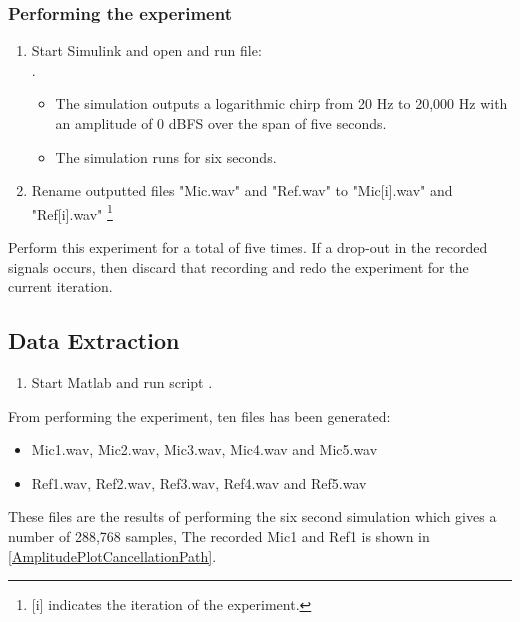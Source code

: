 \subsubsection{Performing the experiment}
\begin{enumerate}
	\item Start Simulink and open and run file:\\ .
	\begin{itemize} 
		\item The simulation outputs a logarithmic chirp from 20 Hz to 20,000 Hz with an amplitude of 0 dBFS over the span of five seconds.
		\item The simulation runs for six seconds.
	\end{itemize}
	\item Rename outputted files "Mic.wav" and "Ref.wav" to "Mic[i].wav" and "Ref[i].wav" \footnote{[i] indicates the iteration of the experiment.}
\end{enumerate}
Perform this experiment for a total of five times. If  a drop-out in the recorded signals occurs, then discard that recording and redo the experiment for the current iteration. 


\subsection{Data Extraction}
\begin{enumerate}
	\item Start Matlab and run script .
\end{enumerate}
From performing the experiment, ten files has been generated:
\begin{itemize}
	\item Mic1.wav, Mic2.wav, Mic3.wav, Mic4.wav and Mic5.wav
	\item Ref1.wav, Ref2.wav, Ref3.wav, Ref4.wav and Ref5.wav
\end{itemize}

These files are the results of performing the six second simulation which gives a number of 288,768 samples, 
The recorded Mic1 and Ref1 is shown in  \autoref{AmplitudePlotCancellationPath}.

